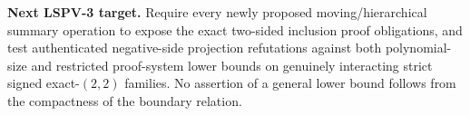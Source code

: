 \documentclass[11pt]{article}
\begin{document}
\noindent\textbf{Next LSPV-3 target.} Require every newly proposed moving/hierarchical summary operation to expose the exact two-sided inclusion proof obligations, and test authenticated negative-side projection refutations against both polynomial-size and restricted proof-system lower bounds on genuinely interacting strict signed exact-$(2,2)$ families. No assertion of a general lower bound follows from the compactness of the boundary relation.



\end{document}
